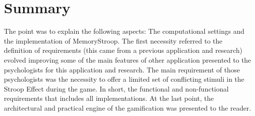 \section{Summary}
		
The point was to explain the following aspects: The computational settings and the implementation of MemoryStroop. The first necessity referred to the definition of requirements (this came from a previous application and research) evolved improving some of the main features of other application presented to the psychologists for this application and research. The main requirement of those psychologists was the necessity to offer a limited set of conflicting stimuli in the Stroop Effect during the game. In short, the functional and non-functional  requirements that includes all implementations.  At the last point, the architectural and practical engine of the gamification was presented to the reader.